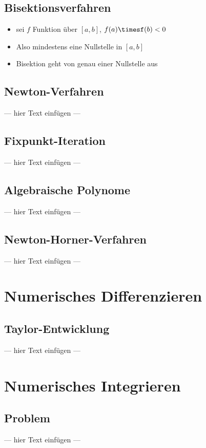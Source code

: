 \documentclass[a4paper, 12pt]{article}
\begin{document}
\subsection{Bisektionsverfahren}
\begin{itemize}
  \item sei \(f\) Funktion über \([a,b]\), \(f(a)\timesf(b)<0\)
  \item Also mindestens eine Nullstelle in \([a,b]\)
  \item Bisektion geht von genau einer Nullstelle aus
\end{itemize}


\subsection{Newton-Verfahren}
--- hier Text einfügen ---


\subsection{Fixpunkt-Iteration}
--- hier Text einfügen ---


\subsection{Algebraische Polynome}
--- hier Text einfügen ---


\subsection{Newton-Horner-Verfahren}
--- hier Text einfügen ---



\section{Numerisches Differenzieren}


\subsection{Taylor-Entwicklung}
--- hier Text einfügen ---



\section{Numerisches Integrieren}


\subsection{Problem}
--- hier Text einfügen ---
\end{document}
